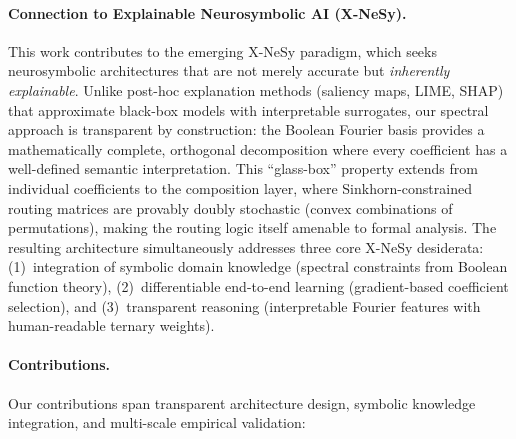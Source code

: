 \documentclass[Royal,times,sageh]{sagej}
\begin{document}
\paragraph{Connection to Explainable Neurosymbolic AI (X-NeSy).}
This work contributes to the emerging X-NeSy paradigm, which seeks neurosymbolic architectures that are not merely accurate but \textit{inherently explainable}. Unlike post-hoc explanation methods (saliency maps, LIME, SHAP) that approximate black-box models with interpretable surrogates, our spectral approach is transparent by construction: the Boolean Fourier basis provides a mathematically complete, orthogonal decomposition where every coefficient has a well-defined semantic interpretation. This ``glass-box'' property extends from individual coefficients to the composition layer, where Sinkhorn-constrained routing matrices are provably doubly stochastic (convex combinations of permutations), making the routing logic itself amenable to formal analysis. The resulting architecture simultaneously addresses three core X-NeSy desiderata: (1)~integration of symbolic domain knowledge (spectral constraints from Boolean function theory), (2)~differentiable end-to-end learning (gradient-based coefficient selection), and (3)~transparent reasoning (interpretable Fourier features with human-readable ternary weights).

\paragraph{Contributions.} Our contributions span transparent architecture design, symbolic knowledge integration, and multi-scale empirical validation:
\end{document}
